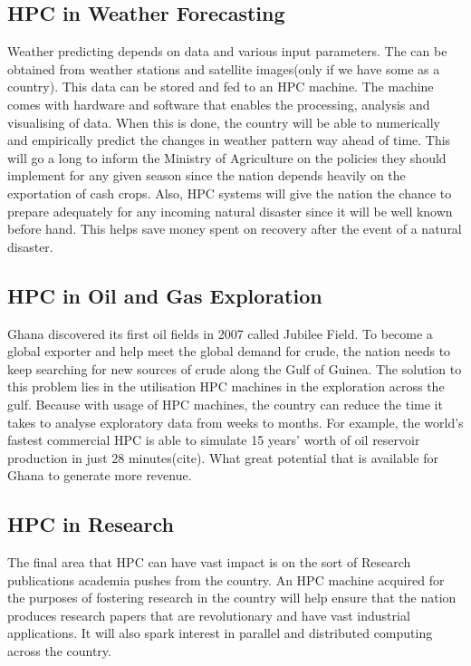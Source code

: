\documentclass[12pt, a4paper, fleqn, titlepage]{article}
\begin{document}
        \subsection{HPC in Weather Forecasting}
        Weather predicting depends on data and various input parameters. The can be obtained from weather stations and satellite images(only if we have some as a country). This data can be stored and fed to an HPC machine. The machine comes with hardware and software that enables the processing, analysis and visualising of data. When this is done, the country will be able to numerically and empirically predict the changes in weather pattern way ahead of time. This will go a long to inform the Ministry of Agriculture on the policies they should implement for any given season since the nation depends heavily on the exportation of cash crops. Also, HPC systems will give the nation the chance to prepare adequately for any incoming natural disaster since it will be well known before hand. This helps save money spent on recovery after the event of a natural disaster.

        \subsection{HPC in Oil and Gas Exploration}
        Ghana discovered its first oil fields in 2007 called Jubilee Field. To become a global exporter and help meet the global demand for crude, the nation needs to keep searching for new sources of crude along the Gulf of Guinea. The solution to this problem lies in the utilisation HPC machines in the exploration across the gulf. Because with usage of HPC machines, the country can reduce the time it takes to analyse exploratory data from weeks to months. For example, the world's fastest commercial HPC is able to simulate 15 years' worth of oil reservoir production in just 28 minutes(cite). What great potential that is available for Ghana to generate more revenue.

        \subsection{HPC in Research}
        The final area that HPC can have vast impact is on the sort of Research publications academia pushes from the country. An HPC machine acquired for the purposes of fostering research in the country will help ensure that the nation produces research papers that are revolutionary and have vast industrial applications. It will also spark interest in parallel and distributed computing across the country.
\end{document}
